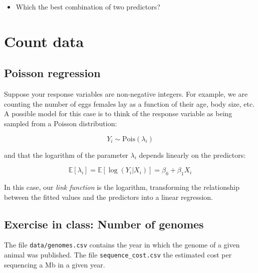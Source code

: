 \documentclass[
  letterpaper,
  DIV=11,
  numbers=noendperiod]{scrreprt}
\providecommand{\tightlist}{%
  \setlength{\itemsep}{0pt}\setlength{\parskip}{0pt}}\usepackage{longtable,booktabs,array}
\begin{document}
\begin{itemize}
\tightlist
\item
  Which the best combination of two predictors?
\end{itemize}

\section{Count data}\label{count-data}

\subsection{Poisson regression}\label{poisson-regression}

Suppose your response variables are non-negative integers. For example,
we are counting the number of eggs females lay as a function of their
age, body size, etc. A possible model for this case is to think of the
response variable as being sampled from a Poisson distribution:

\[
Y_i \sim \text{Pois}(\lambda_i)
\]

and that the logarithm of the parameter \(\lambda_i\) depends linearly
on the predictors:

\[
\mathbb E[\lambda_i] = \mathbb E[\log(Y_i|X_i)] = \beta_0 + \beta_1 X_i
\]

In this case, our \emph{link function} is the logarithm, transforming
the relationship between the fitted values and the predictors into a
linear regression.

\subsection{Exercise in class: Number of
genomes}\label{exercise-in-class-number-of-genomes}

The file \texttt{data/genomes.csv} contains the year in which the genome
of a given animal was published. The file \texttt{sequence\_cost.csv}
the estimated cost per sequencing a Mb in a given year.
\end{document}
